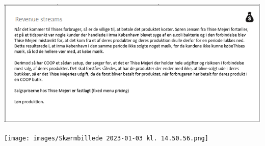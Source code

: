 \documentclass[
  12pt,
  a4paper,
  DIV=11,
  numbers=noendperiod]{scrartcl}
\begin{document}
\includegraphics{images/image-735341634.png}

\texttt{[image: images/Skærmbillede 2023-01-03 kl. 14.50.56.png]}
\end{document}
